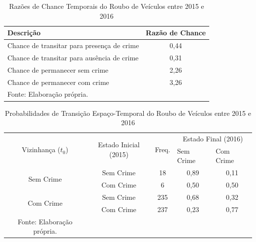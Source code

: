\documentclass[12pt,openright,oneside,a4paper,english,french,spanish]{abntex2}
\numberwithin{table}{section} %
\numberwithin{figure}{section} %
\begin{document}
\begin{subappendices}
\begin{table}[H]
\centering
\caption{Razões de Chance Temporais do Roubo de Veículos entre 2015 e 2016}
        \begin{tabular}{lc}
            \hline
            {\textbf{Descrição}} & {\textbf{Razão de Chance}} \\\hline
            {Chance de transitar para presença de crime} & {0,44} \\
            {Chance de transitar para ausência de crime} & {0,31} \\
            {Chance de permanecer sem crime} & {2,26} \\
            {Chance de permanecer com crime} & {3,26} \\\hline
            \tiny Fonte: Elaboração própria.
        \end{tabular}
    \label{tab:odds_tempo_roub_vei_2015_2016}
\end{table}


\begin{table}[H]
\centering
\caption{Probabilidades de Transição Espaço-Temporal do Roubo de Veículos entre 2015 e 2016}
        \begin{tabular}{ccccc}
            \hline
            \multirow{2}{*}{Vizinhança ($t_0$)} & \multirow{2}{*}{Estado Inicial (2015)} & \multirow{2}{*}{Freq.} & \multicolumn{2}{c}{Estado Final (2016)}  \\\cline{4-5} %
                                        & & & \multicolumn{1}{l}{Sem Crime} & \multicolumn{1}{l}{Com Crime} \\\hline
            \multirow{2}{*}{Sem Crime} & {Sem Crime} & 18 &  {0,89} & {0,11} \\
                                       & {Com Crime} & 6 &   {0,50} & {0,50} \\\hline
            \multirow{2}{*}{Com Crime} & {Sem Crime} & 235 & {0,68} & {0,32} \\
                                       & {Com Crime} & 237 & {0,23} & {0,77} \\\hline
            \tiny Fonte: Elaboração própria.
        \end{tabular}
    \label{tab:prob_espaco_tempo_roub_vei_2015_2016}
\end{table}



\end{subappendices}
\end{document}
